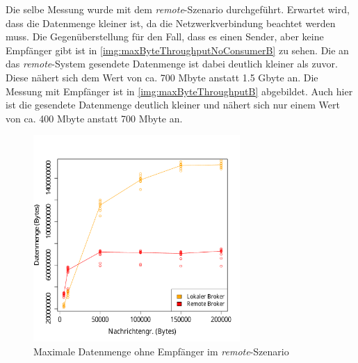 
Die selbe Messung wurde mit dem \textit{remote}-Szenario durchgeführt. Erwartet wird, dass die Datenmenge kleiner ist, da die Netzwerkverbindung beachtet werden muss. 
Die Gegenüberstellung für den Fall, dass es einen Sender, aber keine Empfänger gibt ist in \autoref{img:maxByteThroughputNoConsumerB} zu sehen. Die an das \textit{remote}-System gesendete Datenmenge ist dabei deutlich kleiner als zuvor. Diese nähert sich dem Wert von ca. 700 Mbyte anstatt 1.5 Gbyte an. Die Messung mit Empfänger ist in \autoref{img:maxByteThroughputB} abgebildet. Auch hier ist die gesendete Datenmenge deutlich kleiner und nähert sich nur einem Wert von ca. 400 Mbyte anstatt 700 Mbyte an.
\begin{figure}
\center
 \includegraphics[width=0.7\textwidth]{images/measurement/rate-limit-unlimited-no-consumer-AvsB.pdf}
  \caption{Maximale Datenmenge ohne Empfänger im \textit{remote}-Szenario}
  \label{img:maxByteThroughputNoConsumerB}
\end{figure}
